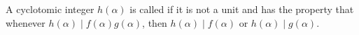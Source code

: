 A cyclotomic integer $h(\alpha)$ is called  if it is not a unit and has the property that whenever $h(\alpha) \mid f(\alpha)g(\alpha)$, then $h(\alpha) \mid f(\alpha)$ or $h(\alpha) \mid g(\alpha)$.
